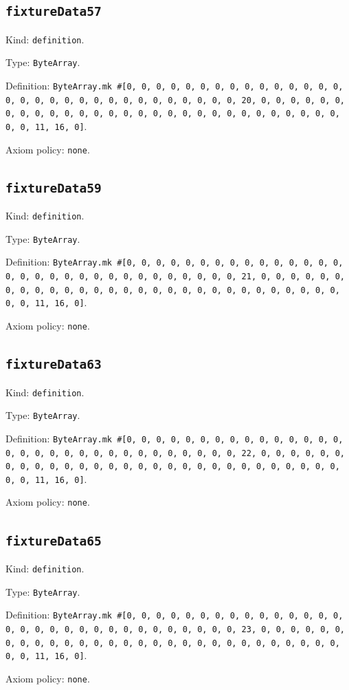 \documentclass[11pt]{article}
\begin{document}
\subsection*{\texttt{fixtureData57}}
\noindent Kind: \texttt{definition}.\par
\noindent Type: \texttt{ByteArray}.\par
\noindent Definition: \texttt{ByteArray.mk \#[0, 0, 0, 0, 0, 0, 0, 0, 0, 0, 0, 0, 0, 0, 0, 0, 0, 0, 0, 0, 0, 0, 0, 0, 0, 0, 0, 0, 0, 0, 0, 20, 0, 0, 0, 0, 0, 0, 0, 0, 0, 0, 0, 0, 0, 0, 0, 0, 0, 0, 0, 0, 0, 0, 0, 0, 0, 0, 0, 0, 0, 0, 0, 11, 16, 0]}.\par
\noindent Axiom policy: \texttt{none}.\par
\subsection*{\texttt{fixtureData59}}
\noindent Kind: \texttt{definition}.\par
\noindent Type: \texttt{ByteArray}.\par
\noindent Definition: \texttt{ByteArray.mk \#[0, 0, 0, 0, 0, 0, 0, 0, 0, 0, 0, 0, 0, 0, 0, 0, 0, 0, 0, 0, 0, 0, 0, 0, 0, 0, 0, 0, 0, 0, 0, 21, 0, 0, 0, 0, 0, 0, 0, 0, 0, 0, 0, 0, 0, 0, 0, 0, 0, 0, 0, 0, 0, 0, 0, 0, 0, 0, 0, 0, 0, 0, 0, 11, 16, 0]}.\par
\noindent Axiom policy: \texttt{none}.\par
\subsection*{\texttt{fixtureData63}}
\noindent Kind: \texttt{definition}.\par
\noindent Type: \texttt{ByteArray}.\par
\noindent Definition: \texttt{ByteArray.mk \#[0, 0, 0, 0, 0, 0, 0, 0, 0, 0, 0, 0, 0, 0, 0, 0, 0, 0, 0, 0, 0, 0, 0, 0, 0, 0, 0, 0, 0, 0, 0, 22, 0, 0, 0, 0, 0, 0, 0, 0, 0, 0, 0, 0, 0, 0, 0, 0, 0, 0, 0, 0, 0, 0, 0, 0, 0, 0, 0, 0, 0, 0, 0, 11, 16, 0]}.\par
\noindent Axiom policy: \texttt{none}.\par
\subsection*{\texttt{fixtureData65}}
\noindent Kind: \texttt{definition}.\par
\noindent Type: \texttt{ByteArray}.\par
\noindent Definition: \texttt{ByteArray.mk \#[0, 0, 0, 0, 0, 0, 0, 0, 0, 0, 0, 0, 0, 0, 0, 0, 0, 0, 0, 0, 0, 0, 0, 0, 0, 0, 0, 0, 0, 0, 0, 23, 0, 0, 0, 0, 0, 0, 0, 0, 0, 0, 0, 0, 0, 0, 0, 0, 0, 0, 0, 0, 0, 0, 0, 0, 0, 0, 0, 0, 0, 0, 0, 11, 16, 0]}.\par
\noindent Axiom policy: \texttt{none}.\par
\end{document}

